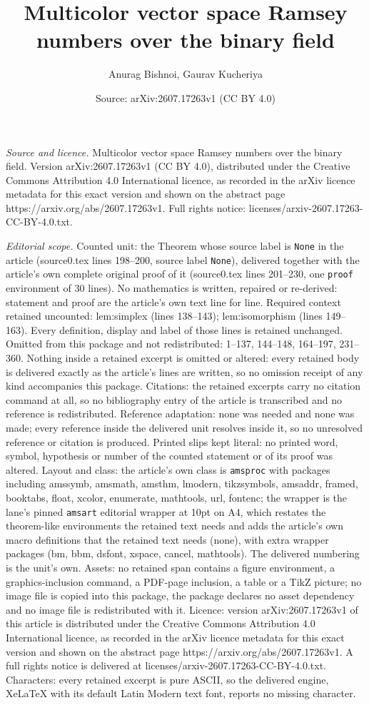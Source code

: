 \documentclass[10pt,a4paper]{amsart}
\title[Multicolor vector space Ramsey numbers over the binary field]{Multicolor vector space Ramsey numbers over the binary field}
\author{Anurag Bishnoi, Gaurav Kucheriya}
\date{Source: arXiv:2607.17263v1 (CC BY 4.0)}
\begin{document}
\maketitle

\noindent\emph{Source and licence.} Multicolor vector space Ramsey numbers over the binary field. Version arXiv:2607.17263v1 (CC BY 4.0), distributed under the Creative Commons Attribution 4.0 International licence, as recorded in the arXiv licence metadata for this exact version and shown on the abstract page https://arxiv.org/abs/2607.17263v1. Full rights notice: licenses/arxiv-2607.17263-CC-BY-4.0.txt.\par\smallskip

\noindent\textit{Editorial scope.} Counted unit: the Theorem whose source label is \texttt{None} in the article (source0.tex lines 198--200, source label \texttt{None}), delivered together with the article's own complete original proof of it (source0.tex lines 201--230, one \texttt{proof} environment of 30 lines). No mathematics is written, repaired or re-derived: statement and proof are the article's own text line for line. Required context retained uncounted: lem:simplex (lines 138--143); lem:isomorphism (lines 149--163). Every definition, display and label of those lines is retained unchanged. Omitted from this package and not redistributed: 1--137, 144--148, 164--197, 231--360. Nothing inside a retained excerpt is omitted or altered: every retained body is delivered exactly as the article's lines are written, so no omission receipt of any kind accompanies this package. Citations: the retained excerpts carry no citation command at all, so no bibliography entry of the article is transcribed and no reference is redistributed. Reference adaptation: none was needed and none was made; every reference inside the delivered unit resolves inside it, so no unresolved reference or citation is produced. Printed slips kept literal: no printed word, symbol, hypothesis or number of the counted statement or of its proof was altered. Layout and class: the article's own class is \texttt{amsproc} with packages including amssymb, amsmath, amsthm, lmodern, tikzsymbols, amsaddr, framed, booktabs, float, xcolor, enumerate, mathtools, url, fontenc; the wrapper is the lane's pinned \texttt{amsart} editorial wrapper at 10pt on A4, which restates the theorem-like environments the retained text needs and adds the article's own macro definitions that the retained text needs (none), with extra wrapper packages (bm, bbm, dsfont, xspace, cancel, mathtools). The delivered numbering is the unit's own. Assets: no retained span contains a figure environment, a graphics-inclusion command, a PDF-page inclusion, a table or a TikZ picture; no image file is copied into this package, the package declares no asset dependency and no image file is redistributed with it. Licence: version arXiv:2607.17263v1 of this article is distributed under the Creative Commons Attribution 4.0 International licence, as recorded in the arXiv licence metadata for this exact version and shown on the abstract page https://arxiv.org/abs/2607.17263v1. A full rights notice is delivered at licenses/arxiv-2607.17263-CC-BY-4.0.txt. Characters: every retained excerpt is pure ASCII, so the delivered engine, XeLaTeX with its default Latin Modern text font, reports no missing character.
\end{document}
